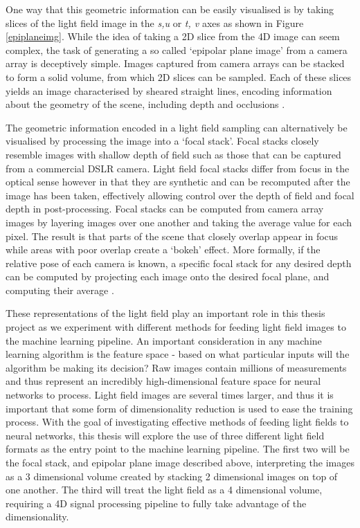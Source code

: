 One way that this geometric information can be easily visualised is by taking slices of the light field image in the \textit{s,u} or \textit{t, v} axes as shown in Figure \ref{epiplaneimg}. While the idea of taking a 2D slice from the 4D image can seem complex, the task of generating a so called `epipolar plane image' from a camera array is deceptively simple. Images captured from camera arrays can be stacked to form a solid volume, from which 2D slices can be sampled. Each of these slices yields an image characterised by sheared straight lines, encoding information about the geometry of the scene, including depth and occlusions \cite{bolles1987epiplane}. 

The geometric information encoded in a light field sampling can alternatively be visualised by processing the image into a `focal stack'. Focal stacks closely resemble images with shallow depth of field such as those that can be captured from a commercial DSLR camera. Light field focal stacks differ from focus in the optical sense however in that they are synthetic and can be recomputed after the image has been taken, effectively allowing control over the depth of field and focal depth in post-processing. Focal stacks can be computed from camera array images by layering images over one another and taking the average value for each pixel. The result is that parts of the scene that closely overlap appear in focus while areas with poor overlap create a `bokeh' effect. More formally, if the relative pose of each camera is known, a specific focal stack for any desired depth can be computed by projecting each image onto the desired focal plane, and computing their average \cite{vaish2004parallax}.

These representations of the light field play an important role in this thesis project as we experiment with different methods for feeding light field images to the machine learning pipeline. An important consideration in any machine learning algorithm is the feature space - based on what particular inputs will the algorithm be making its decision? Raw images contain millions of measurements and thus represent an incredibly high-dimensional feature space for neural networks to process. Light field images are several times larger, and thus it is important that some form of dimensionality reduction is used to ease the training process. With the goal of investigating effective methods of feeding light fields to neural networks, this thesis will explore the use of three different light field formats as the entry point to the machine learning pipeline. The first two will be the focal stack, and epipolar plane image described above, interpreting the images as a 3 dimensional volume created by stacking 2 dimensional images on top of one another. The third will treat the light field as a 4 dimensional volume, requiring a 4D signal processing pipeline to fully take advantage of the dimensionality.


